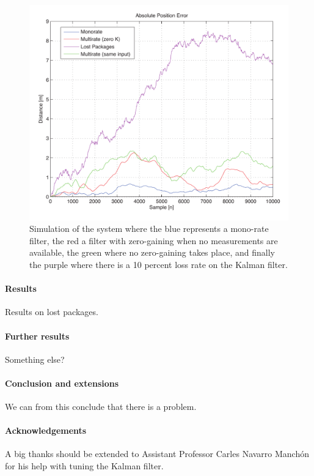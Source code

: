 \documentclass[a0,portrait]{a0poster}
\begin{document}
\begin{center}
{\paragraph{}
\begin{figure}
	\centering %
	\includegraphics[width=\threecolwidth]{img/10percent}
  	\caption{Simulation of the system where the blue represents a mono-rate filter, the red a filter with zero-gaining when no measurements are available, the green where no zero-gaining takes place, and finally the purple where there is a 10 percent loss rate on the Kalman filter.}
	\label{fig:trends}
\end{figure}
\paragraph{Results}
Results on lost packages. 
\paragraph{Further results}
Something else?
\paragraph{Conclusion and extensions}
We can from this conclude that there is a problem.
\paragraph{Acknowledgements} A big thanks should be extended to Assistant Professor Carles Navarro Manchón for his help with tuning the Kalman filter. 


}
\end{center}

\makefooter
\end{document}
